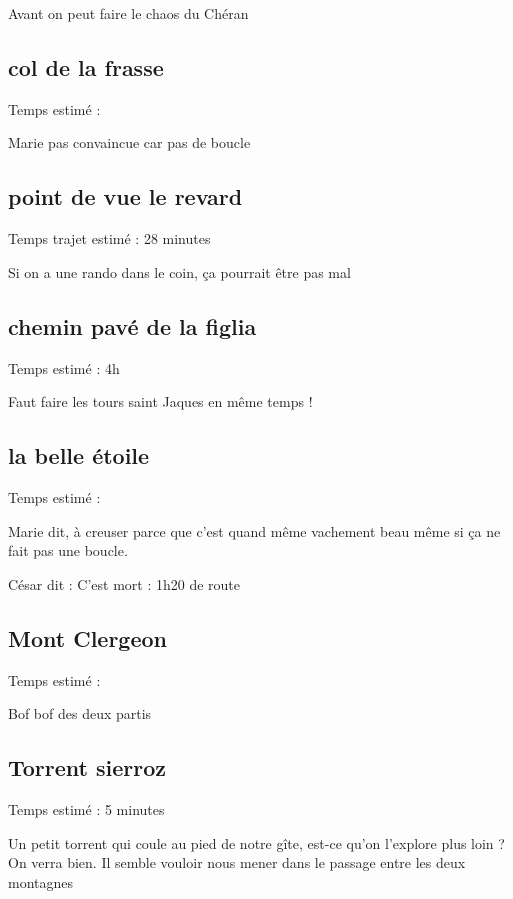 \documentclass[12pt]{article}
\begin{document}
Avant on peut faire le chaos du Chéran

\subsection{col de la frasse}

Temps estimé : 

Marie pas convaincue car pas de boucle

\subsection{point de vue le revard}

Temps trajet estimé : 28 minutes

Si on a une rando dans le coin, ça pourrait être pas mal

\subsection{chemin pavé de la figlia}

Temps estimé : 4h

Faut faire les tours saint Jaques en même temps !

\subsection{la belle étoile}

Temps estimé : 

Marie dit, à creuser parce que c'est quand même vachement beau même si ça ne fait pas une boucle.

César dit : C'est mort : 1h20 de route

\subsection{Mont Clergeon}

Temps estimé : 

Bof bof des deux partis

\subsection{Torrent sierroz}

Temps estimé : 5 minutes

Un petit torrent qui coule au pied de notre gîte, est-ce qu'on l'explore plus loin ? On verra bien. Il semble vouloir nous mener dans le passage entre les deux montagnes
\end{document}
